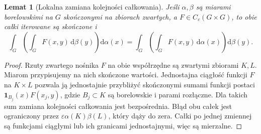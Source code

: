\documentclass[11pt,a4paper]{article}
\numberwithin{equation}{section}
\theoremstyle{plain}
\newtheorem{lemat}[twierdzenie]{Lemat}
\theoremstyle{definition}
\theoremstyle{remark}
\newcommand{\ind}[1]{\mathbf 1_{#1}}
\begin{document}
\begin{lemat}[Lokalna zamiana kolejności całkowania]
Jeśli $\alpha,\beta$ są miarami borelowskimi na $G$ skończonymi na zbiorach zwartych, a $F\in C_c(G\times G)$, to obie całki iterowane są skończone i
\[
\int_G\left(\int_GF(x,y)\,\mathrm d\beta(y)\right)\mathrm d\alpha(x)
=\int_G\left(\int_GF(x,y)\,\mathrm d\alpha(x)\right)\mathrm d\beta(y).
\]
\end{lemat}
\begin{proof}
Rzuty zwartego nośnika $F$ na obie współrzędne są zwartymi zbiorami $K,L$. Miarom przypisujemy na nich skończone wartości. Jednostajna ciągłość funkcji $F$ na $K\times L$ pozwala ją jednostajnie przybliżyć skończonymi sumami funkcji postaci $\ind{B_j}(x)F(x_j,y)$, gdzie $B_j\subset K$ są borelowskie i parami rozłączne. Dla takich sum zamiana kolejności całkowania jest bezpośrednia. Błąd obu całek jest ograniczony przez $\varepsilon\alpha(K)\beta(L)$, który dąży do zera. Całki po jednej zmiennej są funkcjami ciągłymi lub ich granicami jednostajnymi, więc są mierzalne.
\end{proof}
\end{document}
